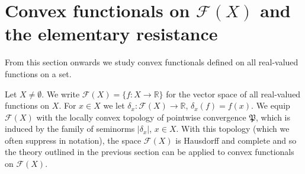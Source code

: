 \documentclass[a4paper,11pt,reqno]{amsart}
\theoremstyle{definition}
\newtheorem{definition}[lemma]{Definition}
\newtheorem{example}[lemma]{Example}
\numberwithin{equation}{section}
\newcommand{\cF}{{\mathcal F}}
\newcommand{\R}{{\mathbb R}}
\newcommand{\fA}{{\mathfrak A}}
\newcommand{\1}{\mathds{1}}
\begin{document}
 
%  
% 
% 
% 
% 
% 
% 
% 
% 
% 
% 
% 
% 
%  
% 
% 
% 



\section{Convex functionals on $\cF(X)$ and the elementary resistance} \label{section:elementary resistance}


From this section onwards we study convex functionals defined on all real-valued functions on a set. 

Let $X \neq \emptyset$. We write $\cF(X) = \{f \colon X \to \R\}$ for the vector space of all real-valued functions on $X$. For $x \in X$ we let $\delta_x \colon \cF(X) \to \R$, $\delta_x(f) = f(x)$. We equip $\cF(X)$ with the locally convex topology  of pointwise convergence $\mathfrak{P}$, which is induced by the family of seminorms $|\delta_x|$, $x \in X$. With this topology (which we often suppress in notation), the space $\cF(X)$ is Hausdorff and complete and so  the theory outlined in the previous section can be applied to convex functionals on $\cF(X)$.  
 
\end{document}
